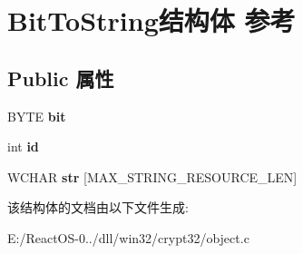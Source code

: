 \hypertarget{struct_bit_to_string}{}\section{Bit\+To\+String结构体 参考}
\label{struct_bit_to_string}
\subsection*{Public 属性}
\begin{DoxyCompactItemize}
\item 
\mbox{\label{struct_bit_to_string_a6479839bd4f52dfa4e214c7ec87db68b}} 
B\+Y\+TE {\bfseries bit}
\item 
\mbox{\label{struct_bit_to_string_acf84ae0d034fa3fe40160c16b7d516cd}} 
int {\bfseries id}
\item 
\mbox{\label{struct_bit_to_string_acd993266590433b781967682ec25c014}} 
W\+C\+H\+AR {\bfseries str} \mbox{[}M\+A\+X\+\_\+\+S\+T\+R\+I\+N\+G\+\_\+\+R\+E\+S\+O\+U\+R\+C\+E\+\_\+\+L\+EN\mbox{]}
\end{DoxyCompactItemize}


该结构体的文档由以下文件生成\+:\begin{DoxyCompactItemize}
\item 
E\+:/\+React\+O\+S-\/0../dll/win32/crypt32/object.\+c\end{DoxyCompactItemize}
